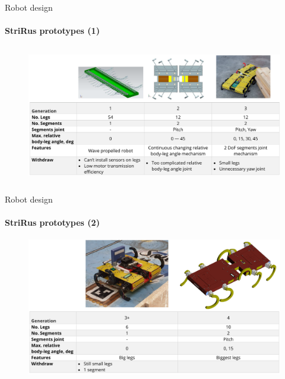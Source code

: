 \documentclass[aspectratio=169,xcolor=table]{beamer}
\begin{document}
\begin{frame}[t]{Robot design}
    \framesubtitle{StriRus prototypes (1)}
    \vspace{-0.7cm}
\begin{figure}[H]
    \centering\includegraphics[height=6cm,width=1\textwidth,keepaspectratio]{gens_1.png}
    \label{fig:gens_1.png}
\end{figure}

\end{frame}

\begin{frame}[t]{Robot design}
    \framesubtitle{StriRus prototypes (2)}
    \vspace{-0.5cm}
    \begin{figure}[H]
        \centering\includegraphics[height=6cm,width=1\textwidth,keepaspectratio]{gens_2.png}
        \label{fig:gens_2.png}
    \end{figure}
\end{frame}
\end{document}

